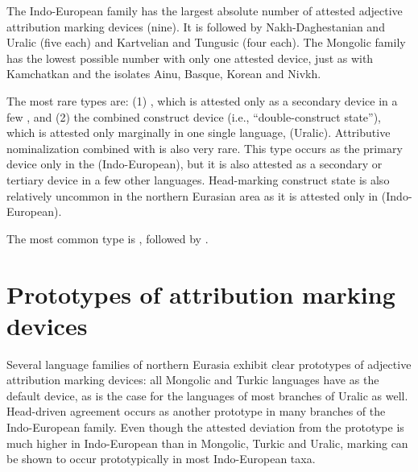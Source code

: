 The Indo-European family has the largest absolute number of attested adjective attribution marking devices (nine). It is followed by Nakh-Daghestanian and Uralic (five each) and Kartvelian and Tungusic (four each). The Mongolic family has the lowest possible number with only one attested device, just as with Kamchatkan and the isolates Ainu, Basque, Korean and Nivkh.

The most rare types are: (1) , which is attested only as a secondary device in a few , and (2) the combined construct device (i.e., “double\hyp{}construct state”), which is attested only marginally in one single language,  (Uralic). Attributive nominalization combined  with  is also very rare. This type occurs as the primary device only in the  (Indo-European), but it is also attested as a secondary or tertiary device in a few other languages. Head-marking construct state is also relatively uncommon in the northern Eurasian area as it is attested only in  (Indo-European).

The most common type is , followed by .

\section{Prototypes of attribution marking devices}
Several language families of northern Eurasia exhibit clear prototypes of adjective attribution marking devices: all Mongolic and Turkic languages have  as the default device, as is the case for the languages of most branches of Uralic as well. Head\hyp{}driven agreement occurs as another prototype in many branches of the Indo-European family. Even though the attested deviation from the prototype is much higher in Indo-European than in Mongolic, Turkic and Uralic,  marking can be shown to occur prototypically in most Indo-European taxa.

